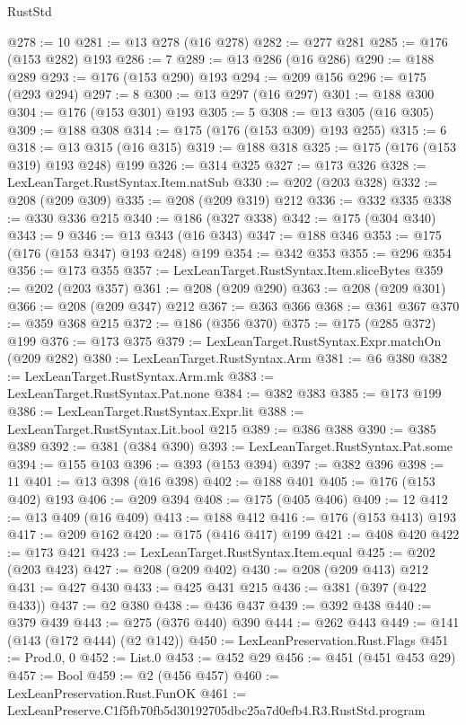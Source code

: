 \begin{lexlean}{RustStd}
\begin{coremodule}
@278 := 10
@281 := @13 @278 (@16 @278)
@282 := @277 @281
@285 := @176 (@153 @282) @193
@286 := 7
@289 := @13 @286 (@16 @286)
@290 := @188 @289
@293 := @176 (@153 @290) @193
@294 := @209 @156
@296 := @175 (@293 @294)
@297 := 8
@300 := @13 @297 (@16 @297)
@301 := @188 @300
@304 := @176 (@153 @301) @193
@305 := 5
@308 := @13 @305 (@16 @305)
@309 := @188 @308
@314 := @175 (@176 (@153 @309) @193 @255)
@315 := 6
@318 := @13 @315 (@16 @315)
@319 := @188 @318
@325 := @175 (@176 (@153 @319) @193 @248) @199
@326 := @314 @325
@327 := @173 @326
@328 := LexLeanTarget.RustSyntax.Item.natSub
@330 := @202 (@203 @328)
@332 := @208 (@209 @309)
@335 := @208 (@209 @319) @212
@336 := @332 @335
@338 := @330 @336 @215
@340 := @186 (@327 @338)
@342 := @175 (@304 @340)
@343 := 9
@346 := @13 @343 (@16 @343)
@347 := @188 @346
@353 := @175 (@176 (@153 @347) @193 @248) @199
@354 := @342 @353
@355 := @296 @354
@356 := @173 @355
@357 := LexLeanTarget.RustSyntax.Item.sliceBytes
@359 := @202 (@203 @357)
@361 := @208 (@209 @290)
@363 := @208 (@209 @301)
@366 := @208 (@209 @347) @212
@367 := @363 @366
@368 := @361 @367
@370 := @359 @368 @215
@372 := @186 (@356 @370)
@375 := @175 (@285 @372) @199
@376 := @173 @375
@379 := LexLeanTarget.RustSyntax.Expr.matchOn (@209 @282)
@380 := LexLeanTarget.RustSyntax.Arm
@381 := @6 @380
@382 := LexLeanTarget.RustSyntax.Arm.mk
@383 := LexLeanTarget.RustSyntax.Pat.none
@384 := @382 @383
@385 := @173 @199
@386 := LexLeanTarget.RustSyntax.Expr.lit
@388 := LexLeanTarget.RustSyntax.Lit.bool @215
@389 := @386 @388
@390 := @385 @389
@392 := @381 (@384 @390)
@393 := LexLeanTarget.RustSyntax.Pat.some
@394 := @155 @103
@396 := @393 (@153 @394)
@397 := @382 @396
@398 := 11
@401 := @13 @398 (@16 @398)
@402 := @188 @401
@405 := @176 (@153 @402) @193
@406 := @209 @394
@408 := @175 (@405 @406)
@409 := 12
@412 := @13 @409 (@16 @409)
@413 := @188 @412
@416 := @176 (@153 @413) @193
@417 := @209 @162
@420 := @175 (@416 @417) @199
@421 := @408 @420
@422 := @173 @421
@423 := LexLeanTarget.RustSyntax.Item.equal
@425 := @202 (@203 @423)
@427 := @208 (@209 @402)
@430 := @208 (@209 @413) @212
@431 := @427 @430
@433 := @425 @431 @215
@436 := @381 (@397 (@422 @433))
@437 := @2 @380
@438 := @436 @437
@439 := @392 @438
@440 := @379 @439
@443 := @275 (@376 @440) @390
@444 := @262 @443
@449 := @141 (@143 (@172 @444) (@2 @142))
@450 := LexLeanPreservation.Rust.Flags
@451 := Prod.{0, 0}
@452 := List.{0}
@453 := @452 @29
@456 := @451 (@451 @453 @29)
@457 := Bool
@459 := @2 (@456 @457)
@460 := LexLeanPreservation.Rust.FunOK
@461 := LexLeanPreserve.C1f5fb70fb5d30192705dbc25a7d0efb4.R3.RustStd.program

\end{coremodule}
\end{lexlean}
